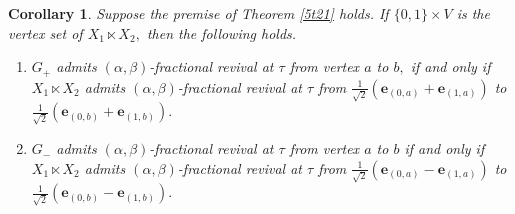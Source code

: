 \documentclass[12pt,a4paper]{article}
\newtheorem{cor}{Corollary}
\def \e {{\bf e}}
\def \u {{\bf u}}
\def \v {{\bf v}}
\def \e {{\mathbf e}}
\begin{document}
\begin{cor}\label{5cor3}
Suppose the premise of Theorem \ref{5t21} holds. If $\{0,1\}\times V$ is the vertex set of $X_1\ltimes X_2,$ then the following holds. 
\begin{enumerate}
\item $G_+$ admits $(\alpha,\beta)$-fractional revival at $\tau$ from vertex $a$ to $b,$ if and only if $X_1\ltimes X_2$ admits $(\alpha,\beta)$-fractional revival at $\tau$ from $\frac{1}{\sqrt{2}}(\e_{(0,a)}+\e_{(1,a)})$ to   $\frac{1}{\sqrt{2}}(\e_{(0,b)}+\e_{(1,b)}).$ 

\item $G_-$ admits $(\alpha,\beta)$-fractional revival at $\tau$ from vertex $a$ to $b$ if and only if $X_1\ltimes X_2$ admits $(\alpha,\beta)$-fractional revival at $\tau$ from $\frac{1}{\sqrt{2}}(\e_{(0,a)}-\e_{(1,a)})$ to $\frac{1}{\sqrt{2}}(\e_{(0,b)}-\e_{(1,b)}).$ 
\end{enumerate}  
\end{cor}
\end{document}
